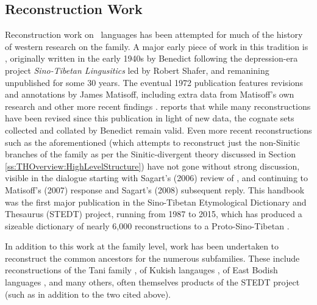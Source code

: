 \subsection{Reconstruction Work}
Reconstruction work on \lfam\ languages has been attempted for much of the history of western research on the family. A major early piece of work in this tradition is , originally written in the early 1940s by Benedict following the depression-era project \textit{Sino-Tibetan Lingusitics} led by Robert Shafer, and remanining unpublished for some 30 years. The eventual 1972 publication features revisions and annotations by James Matisoff, including extra data from Matisoff's own research and other more recent findings \cite{Matisoff2003}.  reports that while many reconstructions have been revised since this publication in light of new data, the cognate sets collected and collated by Benedict remain valid. Even more recent reconstructions such as the aforementioned  (which attempts to reconstruct just the non-Sinitic branches of the family as per the Sinitic-divergent theory discussed in Section \ref{ss:THOverview:HighLevelStructure}) have not gone without strong discussion, visible in the dialogue starting with Sagart's (2006) \nocite{Sagart2006} review of , and continuing to Matisoff's (2007) \nocite{Matisoff2007} response and Sagart's (2008) \nocite{Sagart2008} subsequent reply. This handbook was the first major publication in the Sino-Tibetan Etymological Dictionary and Thesaurus (STEDT) project, running from 1987 to 2015, which has produced a sizeable dictionary of nearly 6,000 reconstructions to a Proto-Sino-Tibetan \cite{STEDT}.

In addition to this work at the family level, work has been undertaken to reconstruct the common ancestors for the numerous subfamilies. These include reconstructions of the Tani family \cite{Sun1993}, of Kukish langauges \cite{VanBik2009}, of East Bodish languages \cite{Hyslop2014a}, and many others, often themselves products of the STEDT project (such as  in addition to the two cited above).
